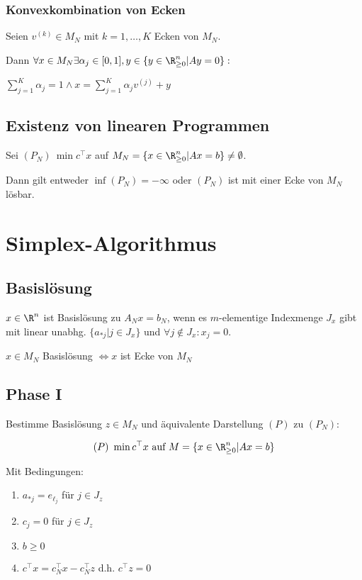 \subsubsection*{Konvexkombination von Ecken}

Seien \( v^{(k)} \in M_N \) mit \(k=1,\dots,K\) Ecken von \(M_N\).

Dann \( \forall x \in M_N \exists \alpha_j \in [0,1], y \in \{ y \in \R_{\geq 0}^n | Ay = 0 \} :\)

\( \sum_{j=1}^K \alpha_j = 1 \land x = \sum_{j=1}^K \alpha_j v^{(j)} + y \)

\subsection*{Existenz von linearen Programmen}

Sei \( (P_N) \ \min c^\top x \) auf \( M_N = \{ x \in \R_{\geq 0}^n | Ax = b \} \neq \emptyset\).

Dann gilt entweder \(\inf (P_N) = -\infty\) oder \((P_N)\) ist mit einer Ecke von \(M_N\) lösbar.

\section*{Simplex-Algorithmus}

\subsection*{Basislösung}

\(x \in \R^n\) ist Basislösung zu \(A_N x = b_N\), wenn es \(m\)-elementige Indexmenge \(J_x\) gibt mit linear unabhg. \(\{a_{*j} | j \in J_x\}\) und \(\forall j \notin J_x : x_j = 0\). 

\spacing

\(x \in M_N\) Basislösung \(\iff x\) ist Ecke von \(M_N\)

\subsection*{Phase I}

Bestimme Basislösung \(z \in M_N\) und äquivalente Darstellung \((P)\) zu \((P_N)\):

\vspace*{-2mm}
\[ (P) \ \min c^\top x \text{ auf } M = \{ x \in \R_{\geq 0}^n | Ax=b \} \]

Mit Bedingungen:

\begin{enumerate}[label=(E\arabic*)]
	\item \(a_{*j} = e_{\ell_j}\) für \(j \in J_z\)
	\item \(c_j = 0\) für \(j \in J_z\)
	\item \(b \geq 0\)
	\item \(c^\top x = c_N^\top x - c_N^\top z\) d.h. \(c^\top z = 0\)
\end{enumerate}

